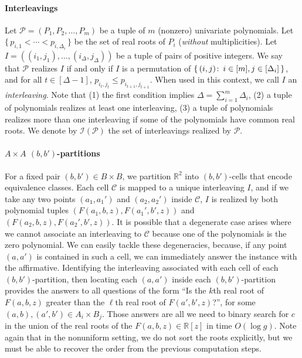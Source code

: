 \paragraph{Interleavings}
Let $\mathcal{P} = (P_1,P_2,\ldots,P_m)$ be a tuple of $m$
(nonzero)
univariate
polynomials.
Let $\{\,p_{i,1} < \cdots < p_{i,\Delta_i}\,\}$
be the set of real roots of $P_i$ (\emph{without} multiplicities).
Let $I = ((i_1,j_1),\ldots,(i_{\Delta},j_\Delta))$
be a tuple of pairs of positive integers.
%
We say that $\mathcal{P}$ realizes $I$ if and only if
$I$ is a permutation of
$\{\,(i,j) \colon\, i \in [m], j \in [\Delta_i]\,\}$, and
for all $t \in [\Delta-1]$, $p_{i_t,j_t} \le p_{i_{t+1},j_{t+1}}$.
When used in this context, we call $I$ an \emph{interleaving}.
%
Note that (1) the first condition implies $\Delta=\sum_{i=1}^{m}\Delta_i$,
(2) a tuple of polynomials realizes at least one interleaving,
(3) a tuple of polynomials realizes more than one interleaving if some of the
polynomials have common real roots.
%
We denote by $\mathcal{I}(\mathcal{P})$ the set of interleavings realized by
$\mathcal{P}$.


\paragraph{$A \times A$ $(b,b')$-partitions}
For a fixed pair $(b,b') \in B\times B$, we partition $\mathbb{R}^2$ into
$(b,b')$-cells that encode equivalence classes. Each cell $\mathcal{C}$ is
mapped to a unique interleaving $I$, and if we take any two points $(a_1,a_1')$
and $(a_2,a_2')$ inside $\mathcal{C}$,
\(I\) is realized by
both polynomial tuples
$(F(a_1,b,z),F(a_1',b',z))$ and
$(F(a_2,b,z),F(a_2',b',z))$.
%
It is possible that a degenerate case arises where we cannot associate an
interleaving to \(\mathcal{C}\) because one of the polynomials is the zero
polynomial. We can easily tackle these degeneracies,
because, if any point \((a,a')\) is contained in such a cell,
we can immediately answer the instance with the affirmative.
%
Identifying the interleaving associated with each cell of each
$(b,b')$-partition, then locating each $(a,a')$ inside each $(b,b')$-partition
provides the answers to all questions of the form ``Is the $k$th real root of
$F(a,b,z)$ greater than the $\ell$th real root of $F(a',b',z)$?'', for some $(a,b),
(a',b')\in A_i\times B_j$. Those answers are all we need to binary
search for $c$ in the union of the real roots of the $F(a,b,z) \in
\mathbb{R}[z]$ in time $O(\log g)$. Note again that in the nonuniform setting,
we do not sort the roots explicitly, but we must be able to recover the order
from the previous computation steps.

